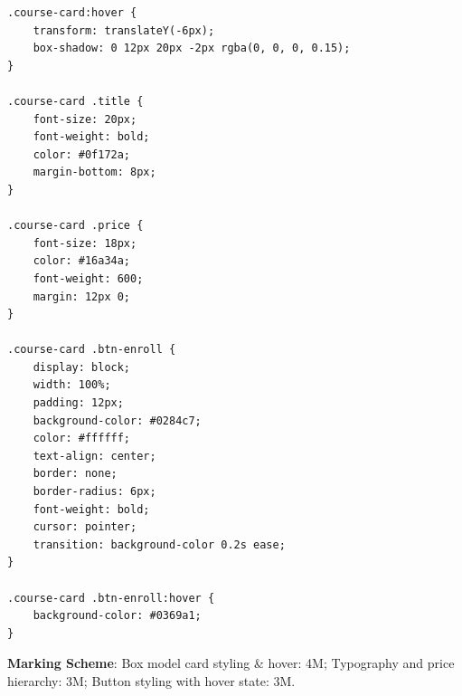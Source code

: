 \begin{solutionbox}
\begin{enumerate}[start=7]
\begin{lstlisting}[language=CSS3]
.course-card:hover {
    transform: translateY(-6px);
    box-shadow: 0 12px 20px -2px rgba(0, 0, 0, 0.15);
}

.course-card .title {
    font-size: 20px;
    font-weight: bold;
    color: #0f172a;
    margin-bottom: 8px;
}

.course-card .price {
    font-size: 18px;
    color: #16a34a;
    font-weight: 600;
    margin: 12px 0;
}

.course-card .btn-enroll {
    display: block;
    width: 100%;
    padding: 12px;
    background-color: #0284c7;
    color: #ffffff;
    text-align: center;
    border: none;
    border-radius: 6px;
    font-weight: bold;
    cursor: pointer;
    transition: background-color 0.2s ease;
}

.course-card .btn-enroll:hover {
    background-color: #0369a1;
}
\end{lstlisting}
\textbf{Marking Scheme}: Box model card styling \& hover: 4M; Typography and price hierarchy: 3M; Button styling with hover state: 3M.
\end{enumerate}
\end{solutionbox}
